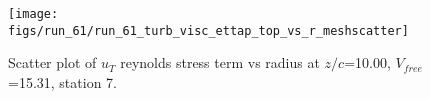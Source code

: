\begin{figure}[H]
\centering
\texttt{[image: figs/run\_61/run\_61\_turb\_visc\_ettap\_top\_vs\_r\_meshscatter]}
\caption{Scatter plot of $
u_T$ reynolds stress term vs radius at $z/c$=10.00, $V_{free}$=15.31, station 7.}
\end{figure}


